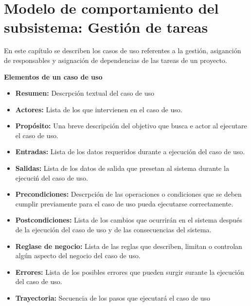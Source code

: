 \chapter{Modelo de comportamiento del subsistema: Gestión de tareas}
\label{cap:reqSist}

En este capítulo se describen los casos de uso referentes a la gestión, asiganción de responsables y asignación de dependencias de las tareas de un proyecto.


\begin{shaded}
		\textcolor{NavyBlue}{\Large\textbf{Elementos de un caso de uso}}
		\begin{itemize}
			\item \textbf{Resumen:} Descrpción textual del caso de uso
			\item \textbf{Actores:} Lista de los que  intervienen en el caso de uso.
			\item \textbf{Propósito:} Una breve descripción del objetivo que busca e actor al ejecutare el caso de uso.
			\item \textbf{Entradas:} Lista de los datos requeridos durante a ejecución del caso de uso.
			\item \textbf{Salidas:} Lista de los datos de salida que presetan al sistema durante la ejecuciń del caso de uso.
			\item \textbf{Precondiciones:} Descrpción de las operaciones o condiciones que se deben cumplir previamente para el caso de uso pueda ejecutarse correctamente.
			\item \textbf{Postcondiciones:} Lista de los cambios que ocurrirán en el sistema después de la ejecución del caso de uso y de las consecuencias del sistema.
			\item \textbf{Reglase de negocio:} Lista de las reglas que describen, limitan o controlan algún aspecto del negocio del caso de uso.
			\item \textbf{Errores:} Lista de los posibles errores que pueden surgir surante la ejecución del caso de uso.
			\item \textbf{Trayectoria:} Secuencia de los pasos que ejecutará el caso de uso
		\end{itemize}		
	\end{shaded}
\newpage

















